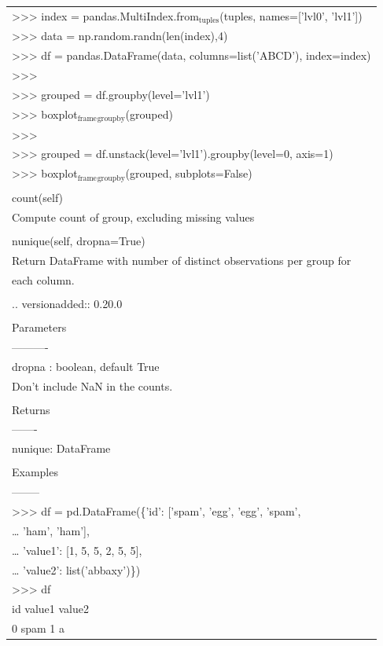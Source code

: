 \documentclass[11pt]{article}
\begin{document}
\begin{enumerate}
\begin{enumerate}
\begin{enumerate}
\begin{center}
\begin{tabular}{l}
>>> index = pandas.MultiIndex.from\(_{\text{tuples}}\)(tuples, names=['lvl0', 'lvl1'])\\
>>> data = np.random.randn(len(index),4)\\
>>> df = pandas.DataFrame(data, columns=list('ABCD'), index=index)\\
>>>\\
>>> grouped = df.groupby(level='lvl1')\\
>>> boxplot\(_{\text{frame}}\)\(_{\text{groupby}}\)(grouped)\\
>>>\\
>>> grouped = df.unstack(level='lvl1').groupby(level=0, axis=1)\\
>>> boxplot\(_{\text{frame}}\)\(_{\text{groupby}}\)(grouped, subplots=False)\\
\\
count(self)\\
Compute count of group, excluding missing values\\
\\
nunique(self, dropna=True)\\
Return DataFrame with number of distinct observations per group for\\
each column.\\
\\
.. versionadded:: 0.20.0\\
\\
Parameters\\
----------\\
dropna : boolean, default True\\
Don't include NaN in the counts.\\
\\
Returns\\
-------\\
nunique: DataFrame\\
\\
Examples\\
--------\\
>>> df = pd.DataFrame(\{'id': ['spam', 'egg', 'egg', 'spam',\\
\ldots{}                           'ham', 'ham'],\\
\ldots{}                    'value1': [1, 5, 5, 2, 5, 5],\\
\ldots{}                    'value2': list('abbaxy')\})\\
>>> df\\
id  value1 value2\\
0  spam       1      a\\

\end{tabular}
\end{center}
\end{enumerate}
\end{enumerate}
\end{enumerate}
\end{document}
